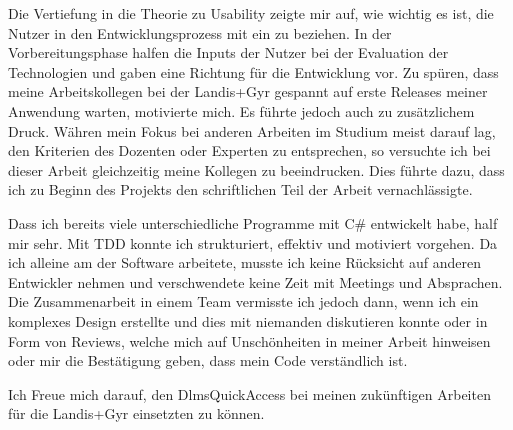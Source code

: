 Die Vertiefung in die Theorie zu Usability zeigte mir auf, wie wichtig es ist, die Nutzer in den Entwicklungsprozess mit ein zu beziehen.
In der Vorbereitungsphase halfen die Inputs der Nutzer bei der Evaluation der Technologien und gaben eine Richtung für die Entwicklung vor.
Zu spüren, dass meine Arbeitskollegen bei der Landis+Gyr gespannt auf erste Releases meiner Anwendung warten, motivierte mich.
Es führte jedoch auch zu zusätzlichem Druck.
Währen mein Fokus bei anderen Arbeiten im Studium meist darauf lag, den Kriterien des Dozenten oder Experten zu entsprechen, so versuchte ich bei dieser Arbeit gleichzeitig meine Kollegen zu beeindrucken.
Dies führte dazu, dass ich zu Beginn des Projekts den schriftlichen Teil der Arbeit vernachlässigte.

Dass ich bereits viele unterschiedliche Programme mit C\# entwickelt habe, half mir sehr.
Mit \ac{TDD} konnte ich strukturiert, effektiv und motiviert vorgehen.
Da ich alleine am der Software arbeitete, musste ich keine Rücksicht auf anderen Entwickler nehmen und verschwendete keine Zeit mit Meetings und Absprachen.
Die Zusammenarbeit in einem Team vermisste ich jedoch dann, wenn ich ein komplexes Design erstellte und dies mit niemanden diskutieren konnte oder in Form von Reviews, welche mich auf Unschönheiten in meiner Arbeit hinweisen oder mir die Bestätigung geben, dass mein Code verständlich ist.

Ich Freue mich darauf, den DlmsQuickAccess bei meinen zukünftigen Arbeiten für die Landis+Gyr einsetzten zu können.\dq



% 

